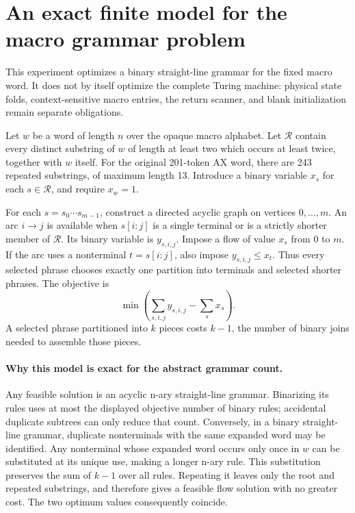 \section{An exact finite model for the macro grammar problem}
\label{sec:grammar-milp}
This experiment optimizes a binary straight-line grammar for the fixed macro
word. It does not by itself optimize the complete Turing machine: physical
state folds, context-sensitive macro entries, the return scanner, and blank
initialization remain separate obligations.

Let $w$ be a word of length $n$ over the opaque macro alphabet. Let $\mathcal R$
contain every distinct substring of $w$ of length at least two which occurs at
least twice, together with $w$ itself. For the original 201-token AX word,
there are 243 repeated substrings, of maximum length 13. Introduce a binary
variable $x_s$ for each $s\in\mathcal R$, and require $x_w=1$.

For each $s=s_0\cdots s_{m-1}$, construct a directed acyclic graph on vertices
$0,\ldots,m$. An arc $i\to j$ is available when $s[i:j]$ is a single terminal
or is a strictly shorter member of $\mathcal R$. Its binary variable is
$y_{s,i,j}$. Impose a flow of value $x_s$ from 0 to $m$. If the arc uses a
nonterminal $t=s[i:j]$, also impose $y_{s,i,j}\le x_t$. Thus every selected
phrase chooses exactly one partition into terminals and selected shorter
phrases. The objective is
\[
       \min\left(\sum_{s,i,j}y_{s,i,j}-\sum_s x_s\right).
\]
A selected phrase partitioned into $k$ pieces costs $k-1$, the number of
binary joins needed to assemble those pieces.

\paragraph{Why this model is exact for the abstract grammar count.}
Any feasible solution is an acyclic n-ary straight-line grammar. Binarizing
its rules uses at most the displayed objective number of binary rules;
accidental duplicate subtrees can only reduce that count. Conversely, in a
binary straight-line grammar, duplicate nonterminals with the same expanded
word may be identified. Any nonterminal whose expanded word occurs only
once in $w$ can be substituted at its unique use, making a longer n-ary rule.
This substitution preserves the sum of $k-1$ over all rules. Repeating it
leaves only the root and repeated substrings, and therefore gives a feasible
flow solution with no greater cost. The two optimum values consequently
coincide.

